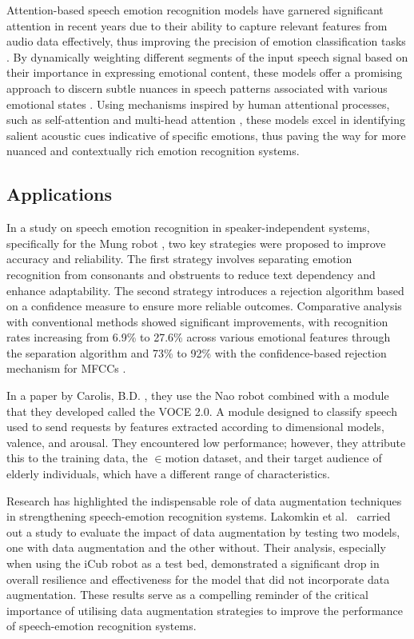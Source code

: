 Attention-based speech emotion recognition models have garnered significant attention in recent years due to their ability to capture relevant features from audio data effectively, thus improving the precision of emotion classification tasks \cite{Peng2020-wv}. By dynamically weighting different segments of the input speech signal \cite{Zhichao2020-bf} based on their importance in expressing emotional content, these models offer a promising approach to discern subtle nuances in speech patterns associated with various emotional states \cite{Nie2022-fo}. Using mechanisms inspired by human attentional processes, such as self-attention and multi-head attention \cite{Rasendrasoa2022-nf}, these models excel in identifying salient acoustic cues indicative of specific emotions, thus paving the way for more nuanced and contextually rich emotion recognition systems.

\subsection{Applications}

In a study on speech emotion recognition in speaker-independent systems, specifically for the Mung robot \cite{Kim2009-in}, two key strategies were proposed to improve accuracy and reliability. The first strategy involves separating emotion recognition from consonants and obstruents to reduce text dependency and enhance adaptability. The second strategy introduces a rejection algorithm based on a confidence measure to ensure more reliable outcomes. Comparative analysis with conventional methods showed significant improvements, with recognition rates increasing from 6.9\% to 27.6\% across various emotional features through the separation algorithm and 73\% to 92\% with the confidence-based rejection mechanism for MFCCs \cite{Kim2018-dh}.

In a paper by Carolis, B.D. \cite{Carolis2016-ig}, they use the Nao robot combined with a module that they developed called the VOCE 2.0. A module designed to classify speech used to send requests by features extracted according to dimensional models, valence, and arousal. They encountered low performance; however, they attribute this to the training data, the \begin{math}\in{}\end{math}motion dataset, and their target audience of elderly individuals, which have a different range of characteristics.

Research has highlighted the indispensable role of data augmentation techniques in strengthening speech-emotion recognition systems. Lakomkin et al.\ \cite{Lakomkin2018-ws} carried out a study to evaluate the impact of data augmentation by testing two models, one with data augmentation and the other without. Their analysis, especially when using the iCub robot as a test bed, demonstrated a significant drop in overall resilience and effectiveness for the model that did not incorporate data augmentation. These results serve as a compelling reminder of the critical importance of utilising data augmentation strategies to improve the performance of speech-emotion recognition systems.


